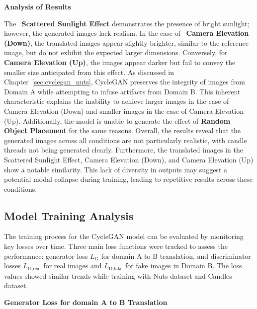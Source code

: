 \documentclass[12pt,DIV14,BCOR12mm,a4paper,footinclude=false,headinclude,parskip=half-,twoside,openright,cleardoublepage=empty,toc=index,bibliography=totoc,listof=totoc]{scrreprt}
\numberwithin{equation}{chapter}
\begin{document}
\textbf{Analysis of Results}

The ~\textbf{Scattered Sunlight Effect} demonstrates the presence of bright sunlight; however, the generated images lack realism. In the case of ~\textbf{Camera Elevation (Down)}, the translated images appear slightly brighter, similar to the reference image, but do not exhibit the expected larger dimensions. Conversely, for \textbf{Camera Elevation (Up)}, the images appear darker but fail to convey the smaller size anticipated from this effect. As discussed in Chapter~\ref{sec:cyclegan_nuts}, CycleGAN preserves the integrity of images from Domain A while attempting to infuse artifacts from Domain B. This inherent characteristic explains the inability to achieve larger images in the case of Camera Elevation (Down) and smaller images in the case of Camera Elevation (Up). Additionally, the model is unable to generate the effect of \textbf{Random Object Placement} for the same reasons. Overall, the results reveal that the generated images across all conditions are not particularly realistic, with candle threads not being generated clearly. Furthermore, the translated images in the Scattered Sunlight Effect, Camera Elevation (Down), and Camera Elevation (Up) show a notable similarity. This lack of diversity in outputs may suggest a potential modal collapse during training, leading to repetitive results across these conditions.

\subsection{Model Training Analysis}

The training process for the CycleGAN model can be evaluated by monitoring key losses over time. Three main loss functions were tracked to assess the performance: generator loss $L_{\text{G}}$ for domain A to B translation, and discriminator losses $L_{\text{D}, \text{real}}$ for real images and $L_{\text{D}, \text{fake}}$ for fake images in Domain B. The loss values showed similar trends while training with Nuts dataset and Candles dataset.

\textbf{Generator Loss for domain A to B Translation}
\end{document}
